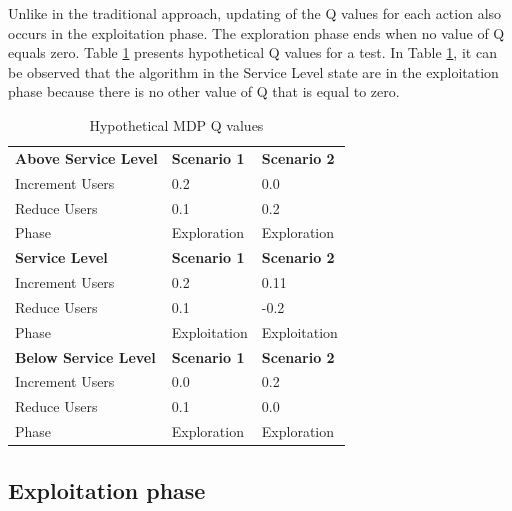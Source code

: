 \documentclass{bmcart}
\begin{document}
 
 
Unlike in the traditional approach, updating of the Q values for each action also occurs in the exploitation phase. The exploration phase ends when no value of Q equals zero. Table \ref{pab:mdp} presents hypothetical Q values for a test. In Table \ref{pab:mdp}, it can be observed that the algorithm in the Service Level state are in the exploitation phase because there is no other value of Q that is equal to zero. 

\begin{table}[h]
\centering
\caption{Hypothetical MDP Q values }
\label{pab:mdp}
\begin{tabular}{lll}
\rowcolor[HTML]{C0C0C0} 
\textbf{Above Service Level}  & \textbf{Scenario 1} & \textbf{Scenario 2} \\
Increment Users               & 0.2                 & 0.0                 \\
Reduce Users                  & 0.1                 & 0.2                 \\
Phase                         & Exploration         & Exploration         \\
\rowcolor[HTML]{C0C0C0} 
\textbf{Service Level}        & \textbf{Scenario 1} & \textbf{Scenario 2} \\
Increment Users               & 0.2                 & 0.11                \\
Reduce Users                  & 0.1                 & -0.2                \\
\rowcolor[HTML]{F8FF00} 
Phase                         & Exploitation         & Exploitation         \\
\rowcolor[HTML]{C0C0C0} 
\textbf{Below Service Level} & \textbf{Scenario 1} & \textbf{Scenario 2} \\
Increment Users               & 0.0                 & 0.2                 \\
Reduce Users                  & 0.1                 & 0.0                 \\
Phase                         & Exploration         & Exploration        
\end{tabular}
\end{table}

\subsection{Exploitation phase}
\end{document}
